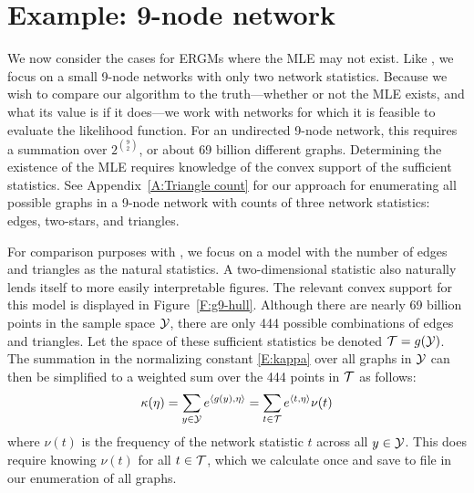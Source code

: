  
\section{Example: 9-node network} \label{S:Example:9node}
We now consider the cases for ERGMs where the MLE may not exist.
Like \citet{Handcock:degeneracy, Rinaldo:2009}, we focus on a small 9-node networks
with only two network statistics.  
Because we wish to compare our algorithm to the truth---whether or not the MLE exists, 
and what its value
is if it does---we work with networks for which it is feasible to 
evaluate the likelihood
function.  For an undirected 9-node network, this requires a summation 
over  $2^{{9\choose 2}}$, or about 69 billion different graphs.  Determining the existence of the MLE
requires knowledge of the convex support of the sufficient statistics.  See 
Appendix~\ref{A:Triangle count} for our approach for enumerating all possible 
graphs in a 9-node network with counts of three network statistics: edges, two-stars, and triangles.


For comparison purposes with \citet{Rinaldo:2009}, we focus on a model with the number 
of edges and triangles as the natural statistics.  A two-dimensional statistic 
also naturally lends itself to more easily interpretable figures.  The relevant convex support for this model is displayed in Figure~\ref{F:g9-hull}.  Although there are nearly 69 billion points in the sample space ${\mathcal Y}$, there are only 444 possible combinations of edges and triangles.
Let the space of these sufficient statistics be denoted ${\mathcal T} = g({\mathcal Y})$.
The summation in the normalizing constant \eqref{E:kappa} over all graphs in ${\mathcal Y}$ can then be simplified
 to a weighted sum over the 444 points in ${\mathcal T}$ as follows:
\begin{align*}
	\kappa(\eta) = \sum_{y \in {\mathcal Y}} e^{\langle g(y),\eta \rangle } = 	\sum_{t \in {\mathcal T}} e^{\langle t,\eta \rangle } \nu(t)
\end{align*}
where $\nu(t)$ is the frequency of the network statistic $t$ across all $y \in {\mathcal Y}$.  
This does require knowing $\nu(t)$ for all $t \in {\mathcal T}$, which we calculate once
and save to file in our enumeration of all graphs.

